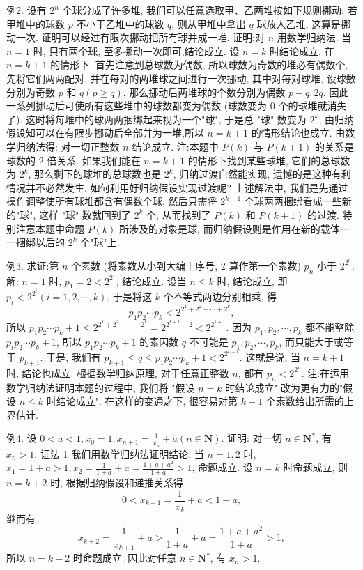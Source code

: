 例2. 设有 $2^n$ 个球分成了许多堆, 我们可以任意选取甲、乙两堆按如下规则挪动: 若甲堆中的球数 $p$ 不小于乙堆中的球数 $q$, 则从甲堆中拿出 $q$ 球放人乙堆, 这算是挪动一次.
证明可以经过有限次挪动把所有球并成一堆.
证明:对 $n$ 用数学归纳法.
当 $n=1$ 时, 只有两个球, 至多挪动一次即可,结论成立.
设 $n=k$ 时结论成立.
在 $n=k+1$ 的情形下, 首先注意到总球数为偶数, 所以球数为奇数的堆必有偶数个, 先将它们两两配对, 并在每对的两堆球之间进行一次挪动, 其中对每对球堆, 设球数分别为奇数 $p$ 和 $q(p \geqslant q)$, 那么挪动后两堆球的个数分别为偶数 $p-q, 2 q$. 因此一系列挪动后可使所有这些堆中的球数都变为偶数 (球数变为 0 个的球堆就消失了). 这时将每堆中的球两两捆绑起来视为一个"球", 于是总 "球" 数变为 $2^k$, 由归纳假设知可以在有限步挪动后全部并为一堆,所以 $n=k+1$ 的情形结论也成立.
由数学归纳法得: 对一切正整数 $n$ 结论成立.
注:本题中 $P(k)$ 与 $P(k+1)$ 的关系是球数的 2 倍关系.
如果我们能在 $n =k+1$ 的情形下找到某些球堆, 它们的总球数为 $2^k$, 那么剩下的球堆的总球数也是 $2^k$, 归纳过渡自然能实现, 遗憾的是这种有利情况并不必然发生.
如何利用好归纳假设实现过渡呢? 上述解法中, 我们是先通过操作调整使所有球堆都含有偶数个球, 然后只需将 $2^{k+1}$ 个球两两捆绑看成一些新的"球", 这样 "球" 数就回到了 $2^k$ 个, 从而找到了 $P(k)$ 和 $P(k+1)$ 的过渡.
特别注意本题中命题 $P(k)$ 所涉及的对象是球, 而归纳假设则是作用在新的载体一一捆绑以后的 $2^k$ 个"球"上.



例3. 求证:第 $n$ 个素数 (将素数从小到大编上序号, 2 算作第一个素数) $p_n$ 小于 $2^{2^n}$.
解: $n=1$ 时, $p_1=2<2^{2^1}$, 结论成立.
设当 $n \leqslant k$ 时, 结论成立, 即 $p_i<2^{2^i}(i=1,2, \cdots, k)$, 于是将这 $k$ 个不等式两边分别相乘, 得
$$
p_1 p_2 \cdots p_k<2^{2^1+2^2+\cdots+2^k},
$$
所以 $p_1 p_2 \cdots p_k+1 \leqslant 2^{2^1+2^2+\cdots+2^k}=2^{2^{k+1}-2}<2^{2^{k+1}}$.
因为 $p_1, p_2, \cdots, p_k$ 都不能整除 $p_i p_2 \cdots p_k+1$, 所以 $p_1 p_2 \cdots p_k+1$ 的素因数 $q$ 不可能是 $p_1, p_2, \cdots, p_k$, 而只能大于或等于 $p_{k+1}$.
于是, 我们有 $p_{k+1} \leqslant q \leqslant p_1 p_2 \cdots p_k+1<2^{2^{k+1}}$.
这就是说, 当 $n=k+1$ 时, 结论也成立.
根据数学归纳原理, 对于任意正整数 $n$, 都有 $p_n<2^{2^n}$.
注:在运用数学归纳法证明本题的过程中, 我们将 "假设 $n=k$ 时结论成立" 改为更有力的"假设 $n \leqslant k$ 时结论成立". 在这样的变通之下, 很容易对第 $k+1$ 个素数给出所需的上界估计.



例4. 设 $0<a<1, x_0=1, x_{n+1}=\frac{1}{x_n}+a(n \in \mathbf{N})$. 证明: 对一切 $n \in \mathbf{N}^*$, 有 $x_n>1$.
证法 1 我们用数学归纳法证明结论.
当 $n=1,2$ 时, $x_1=1+a>1, x_2=\frac{1}{1+a}+a=\frac{1+a+a^2}{1+a}>1$, 命题成立.
设 $n=k$ 时命题成立, 则 $n=k+2$ 时, 根据归纳假设和递推关系得
$$
0<x_{k+1}=\frac{1}{x_k}+a<1+a,
$$
继而有
$$
x_{k+2}=\frac{1}{x_{k+1}}+a>\frac{1}{1+a}+a=\frac{1+a+a^2}{1+a}>1,
$$
所以 $n=k+2$ 时命题成立.
因此对任意 $n \in \mathbf{N}^*$, 有 $x_n>1$.




